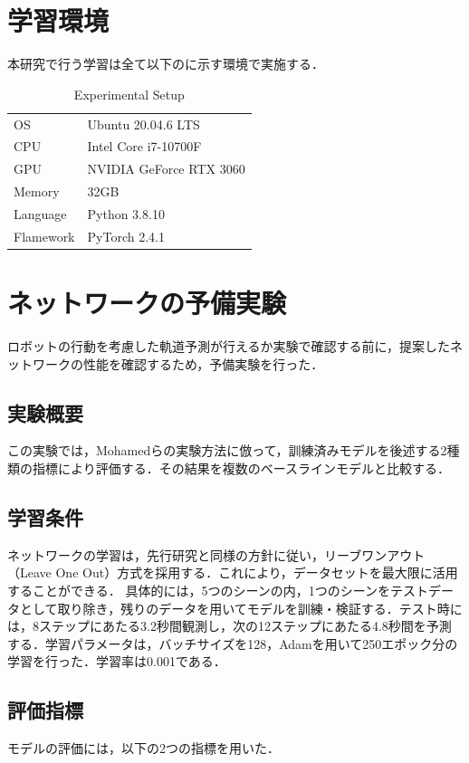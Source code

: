 \newpage

\section{学習環境}
本研究で行う学習は全て以下のに示す環境で実施する．

\begin{table}[hbtp]
  \centering
  \caption{Experimental Setup}
  \label{tab:environment}
  \begin{tabular}{ll}
    \hline
    OS & Ubuntu 20.04.6 LTS \\
    CPU & Intel Core i7-10700F \\
    GPU & NVIDIA GeForce RTX 3060 \\
    Memory & 32GB \\
    Language & Python 3.8.10 \\
    Flamework & PyTorch 2.4.1 \\
    \hline
  \end{tabular}
\end{table}

\section{ネットワークの予備実験}
ロボットの行動を考慮した軌道予測が行えるか実験で確認する前に，提案したネットワークの性能を確認するため，予備実験を行った．

\subsection{実験概要}
この実験では，Mohamedら\cite{s-stgcnn}の実験方法に倣って，訓練済みモデルを後述する2種類の指標により評価する．その結果を複数のベースラインモデルと比較する．

\subsection{学習条件}
ネットワークの学習は，先行研究\cite{s-lstm,s-stgcnn}と同様の方針に従い，リーブワンアウト（Leave One Out）方式を採用する．これにより，データセットを最大限に活用することができる．
具体的には，5つのシーンの内，1つのシーンをテストデータとして取り除き，残りのデータを用いてモデルを訓練・検証する．テスト時には，8ステップにあたる3.2秒間観測し，次の12ステップにあたる4.8秒間を予測する．学習パラメータは，バッチサイズを128，Adam\cite{kingma2014adam}を用いて250エポック分の学習を行った．学習率は0.001である．

\subsection{評価指標}
モデルの評価には，以下の2つの指標を用いた．

